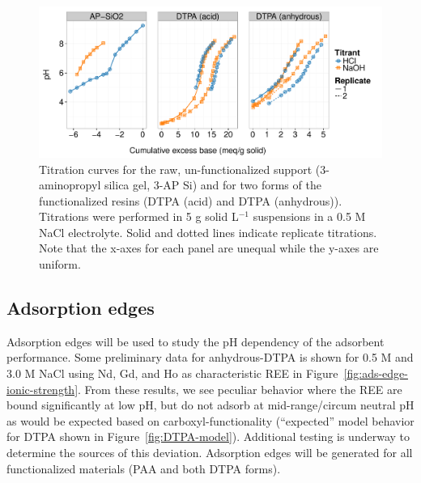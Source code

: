 \begin{figure}[htbp]
\begin{center}
\includegraphics[width = \textwidth]{proposal_figures/Titrations.pdf}
\caption{Titration curves for the raw, un-functionalized support (3-aminopropyl silica gel, 3-AP Si) and for two forms of the functionalized resins (DTPA (acid) and DTPA (anhydrous)).
Titrations were performed in 5 g solid L$^{-1}$ suspensions in a 0.5 M NaCl electrolyte.
Solid and dotted lines indicate replicate titrations.
Note that the x-axes for each panel are unequal while the y-axes are uniform.}\label{fig:titr}
\end{center}
\end{figure}

\subsection{Adsorption edges}

Adsorption edges will be used to study the pH dependency of the adsorbent performance.
Some preliminary data for anhydrous-DTPA is shown for 0.5 M and 3.0 M NaCl using Nd, Gd, and Ho as characteristic REE in Figure~\ref{fig:ads-edge-ionic-strength}.
From these results, we see peculiar behavior where the REE are bound significantly at low pH, but do not adsorb at mid-range/circum neutral pH as would be expected based on carboxyl-functionality (``expected'' model behavior for DTPA shown in Figure~\ref{fig:DTPA-model}).
Additional testing is underway to determine the sources of this deviation.
Adsorption edges will be generated for all functionalized materials (PAA and both DTPA forms).

